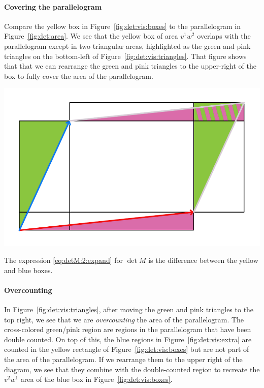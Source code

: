 \documentclass[12pt, oneside]{report}    %
\begin{document}
\paragraph{Covering the parallelogram} Compare the yellow box in Figure~\ref{fig:det:vis:boxes} to the parallelogram in Figure~\ref{fig:det:area}. We see that the yellow box of area $v^1w^2$ overlaps with the parallelogram except in two triangular areas, highlighted as the green and pink triangles on the bottom-left of Figure~\ref{fig:det:vis:triangles}. That figure shows that that we can rearrange the green and pink triangles to the upper-right of the box to fully cover the area of the parallelogram. 
\begin{marginfigure}%
    \includegraphics[width=\textwidth]{figures/det TwoPiecesofDetall.pdf}
    \caption{The expression \eqref{eq:detM:2:expand} for $\det M$ is the difference between the yellow and blue boxes.}
    \label{fig:det:vis:triangles}
\end{marginfigure}

\paragraph{Overcounting} In Figure~\ref{fig:det:vis:triangles}, after moving the green and pink triangles to the top right, we see that we are \emph{overcounting} the area of the parallelogram. The cross-colored green/pink region are regions in the parallelogram that have been double counted. On top of this, the blue regions in Figure~\ref{fig:det:vis:extra} are counted in the yellow rectangle of Figure~\ref{fig:det:vis:boxes}  but are not part of the area of the parallelogram. If we rearrange them to the upper right of the diagram, we see that they combine with the double-counted region to recreate the $v^2w^1$ area of the blue box in Figure~\ref{fig:det:vis:boxes}. 
\end{document}

